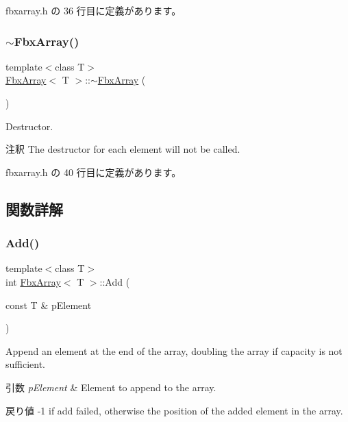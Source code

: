  fbxarray.\+h の 36 行目に定義があります。

\mbox{\label{class_fbx_array_aa059390701fad11dba2a073240480e1c}} 
\subsubsection{\texorpdfstring{$\sim$\+Fbx\+Array()}{~FbxArray()}}
{\footnotesize\ttfamily template$<$class T$>$ \\
\hyperlink{class_fbx_array}{Fbx\+Array}$<$ T $>$\+::$\sim$\hyperlink{class_fbx_array}{Fbx\+Array} (\begin{DoxyParamCaption}{ }\end{DoxyParamCaption})\hspace{0.3cm}{\ttfamily [inline]}}

Destructor. \begin{DoxyRemark}{注釈}
The destructor for each element will not be called. 
\end{DoxyRemark}


 fbxarray.\+h の 40 行目に定義があります。



\subsection{関数詳解}
\mbox{\label{class_fbx_array_aad977e99a3924f6cd758f90c26435d21}} 
\subsubsection{\texorpdfstring{Add()}{Add()}}
{\footnotesize\ttfamily template$<$class T$>$ \\
int \hyperlink{class_fbx_array}{Fbx\+Array}$<$ T $>$\+::Add (\begin{DoxyParamCaption}\item[{const T \&}]{p\+Element }\end{DoxyParamCaption})\hspace{0.3cm}{\ttfamily [inline]}}

Append an element at the end of the array, doubling the array if capacity is not sufficient. 
\begin{DoxyParams}{引数}
{\em p\+Element} & Element to append to the array. \\
\hline
\end{DoxyParams}
\begin{DoxyReturn}{戻り値}
-\/1 if add failed, otherwise the position of the added element in the array. 
\end{DoxyReturn}


